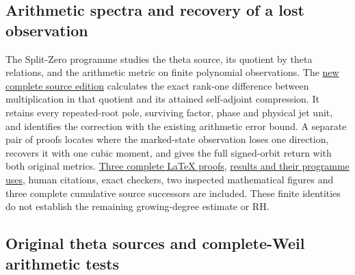 \documentclass[
]{article}
\begin{document}
\subsection{Arithmetic spectra and recovery of a lost
observation}\label{arithmetic-spectra-and-recovery-of-a-lost-observation}

The Split-Zero programme studies the theta source, its quotient by theta
relations, and the arithmetic metric on finite polynomial observations.
The
\href{https://github.com/KokunoYumeto/zeta-function-research-reader/blob/main/workbenches/splitzero-tandem/continuations/20260920-native-secular-frame/README.md}{new
complete source edition} calculates the exact rank-one difference
between multiplication in that quotient and its attained self-adjoint
compression. It retains every repeated-root pole, surviving factor,
phase and physical jet unit, and identifies the correction with the
existing arithmetic error bound. A separate pair of proofs locates where
the marked-state observation loses one direction, recovers it with one
cubic moment, and gives the full signed-orbit return with both original
metrics.
\href{https://github.com/KokunoYumeto/zeta-function-research-reader/blob/main/workbenches/splitzero-tandem/continuations/20260920-native-secular-frame/COMPLETE_PROOFS.tex}{Three
complete LaTeX proofs},
\href{https://github.com/KokunoYumeto/zeta-function-research-reader/blob/main/workbenches/splitzero-tandem/continuations/20260920-native-secular-frame/RESULT_INDEX.json}{results
and their programme uses}, human citations, exact checkers, two
inspected mathematical figures and three complete cumulative source
successors are included. These finite identities do not establish the
remaining growing-degree estimate or RH.

\subsection{Original theta sources and complete-Weil arithmetic
tests}\label{original-theta-sources-and-complete-weil-arithmetic-tests}
\end{document}
